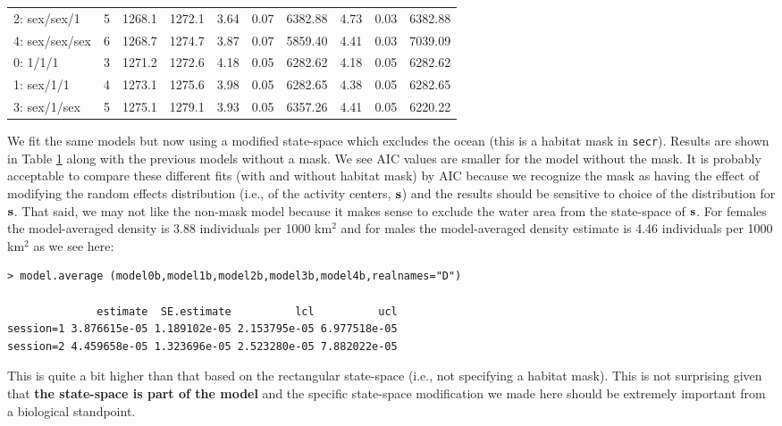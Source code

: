 \begin{table}[ht]
\begin{tabular}{lccccccccc}
2: sex/sex/1   &  5& 1268.1& 1272.1 &  3.64& 0.07& 6382.88& 4.73& 0.03& 6382.88 \\
4: sex/sex/sex &  6& 1268.7& 1274.7 &3.87& 0.07& 5859.40& 4.41& 0.03& 7039.09\\
0: 1/1/1       &  3& 1271.2& 1272.6 &4.18& 0.05& 6282.62& 4.18& 0.05& 6282.62\\
1: sex/1/1     &  4& 1273.1& 1275.6 &3.98& 0.05& 6282.65& 4.38& 0.05& 6282.65\\
3: sex/1/sex   &  5& 1275.1& 1279.1 &3.93& 0.05& 6357.26& 4.41& 0.05& 6220.22\\
\hline
\end{tabular}
\label{gof.tab.aic}
\end{table}


We fit the same models but now using a modified state-space which
excludes the ocean (this is a habitat mask in \mbox{\tt secr}).
 Results are shown in Table \ref{gof.tab.aic} along with
the previous models without a mask.  We see AIC values are smaller for
the model without the mask. It is probably acceptable to compare these
different fits (with and without habitat mask) by AIC because we
recognize the mask as having the effect of modifying the random
effects distribution (i.e., of the activity centers, ${\bf s}$) and
the results should be sensitive to choice of the distribution for
${\bf s}$. That said, we may not like the non-mask model because it
makes sense to exclude the water area from the state-space of ${\bf
  s}$.  For females the model-averaged density is 3.88 individuals per
1000 km$^2$ and for males the model-averaged density estimate is 4.46
individuals per 1000 km$^2$ as we see here:
{\small
\begin{verbatim}
> model.average (model0b,model1b,model2b,model3b,model4b,realnames="D")

              estimate  SE.estimate          lcl          ucl
session=1 3.876615e-05 1.189102e-05 2.153795e-05 6.977518e-05
session=2 4.459658e-05 1.323696e-05 2.523280e-05 7.882022e-05
\end{verbatim}
}
This is quite a bit higher than that based on the rectangular state-space
(i.e., not specifying a habitat mask). This is not surprising given
that {\bf the state-space is part of the model} and the specific
state-space modification we made here should be extremely important
from a biological standpoint.


